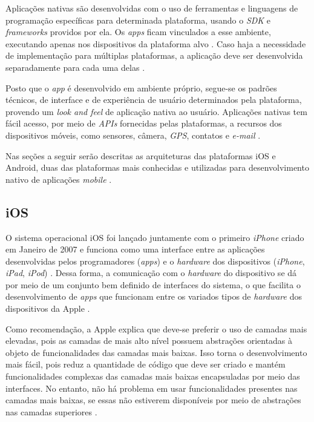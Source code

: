 Aplicações nativas são desenvolvidas com o uso de ferramentas e linguagens de programação específicas para determinada plataforma, 
usando o \textit{SDK} e \textit{frameworks} providos por ela. Os \textit{apps} ficam vinculados a esse ambiente, executando apenas 
nos dispositivos da plataforma alvo \cite{kassas_taxonomy_2015}. Caso haja a necessidade de implementação para múltiplas plataformas, 
a aplicação deve ser desenvolvida separadamente para cada uma delas \cite{heitkotter_evaluating_2013}.

Posto que o \textit{app} é desenvolvido em ambiente próprio, segue-se os padrões técnicos, de interface e de experiência de usuário determinados pela plataforma, provendo um \textit{look and feel} de aplicação nativa ao usuário.
Aplicações nativas tem fácil acesso, por meio de \textit{APIs} fornecidas pelas plataformas, a recursos dos dispositivos móveis, como sensores, câmera, \textit{GPS}, contatos e \textit{e-mail} \cite{kassas_taxonomy_2015}.

Nas seções a seguir serão descritas as arquiteturas das plataformas iOS e Android, duas das plataformas mais conhecidas e utilizadas para desenvolvimento nativo de aplicações \textit{mobile} \cite{jobe_native_2013}.

\subsection{iOS} \label{subsection:ios}

O sistema operacional iOS foi lançado juntamente com o primeiro \textit{iPhone} criado em Janeiro de 2007 e 
funciona como uma interface entre as aplicações desenvolvidas pelos programadores (\textit{apps}) e o \textit{hardware} 
dos dispositivos (\textit{iPhone}, \textit{iPad}, \textit{iPod}) \cite{apple_inc_apple_2007}. 
Dessa forma, a comunicação com o \textit{hardware} do dispositivo se dá 
por meio de um conjunto bem definido de interfaces do sistema, o que facilita o desenvolvimento de \textit{apps} 
que funcionam entre os variados tipos de \textit{hardware} dos dispositivos da Apple \cite{apple_inc_developing_2016}. 

Como recomendação, a Apple explica que deve-se preferir o uso de camadas mais elevadas, pois as camadas de 
mais alto nível possuem abstrações orientadas à objeto de funcionalidades das camadas mais baixas. Isso 
torna o desenvolvimento mais fácil, pois reduz a quantidade de código que deve ser criado e mantém funcionalidades 
complexas das camadas mais baixas encapsuladas por meio das interfaces. No entanto, não há problema em usar 
funcionalidades presentes nas camadas mais baixas, se essas não estiverem disponíveis por meio de abstrações nas 
camadas superiores \cite{apple_inc_tech_2014}. 

